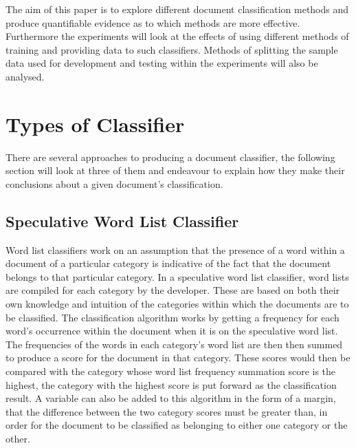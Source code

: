 \documentclass{llncs}
\begin{document}
The aim of this paper is to explore different document classification methods and produce quantifiable evidence as to which methods are more effective. Furthermore the experiments will look at the effects of using different methods of training and providing data to such classifiers. Methods of splitting the sample data used for development and testing within the experiments will also be analysed.

\section{Types of Classifier}
There are several approaches to producing a document classifier, the following section will look at three of them and endeavour to explain how they make their conclusions about a given document's classification. 

\subsection{Speculative Word List Classifier}
Word list classifiers work on an assumption that the presence of a word within a document of a particular category is indicative of the fact that the document belongs to that particular category. In a speculative word list classifier, word lists are compiled for each category by the developer. These are based on both their own knowledge and intuition of the categories within which the documents are to be classified. The classification algorithm works by getting a frequency for each word's occurrence within the document when it is on the speculative word list. The frequencies of the words in each category’s word list are then then summed to produce a score for the document in that category. These scores would  then be compared with the category whose word list frequency summation score is the highest, the category with the highest score is put forward as the classification result. A variable can also be added to this algorithm in the form of a margin, that the difference between the two category scores must be greater than, in order for the document to be classified as belonging to either one category or the other. 

\end{document}
